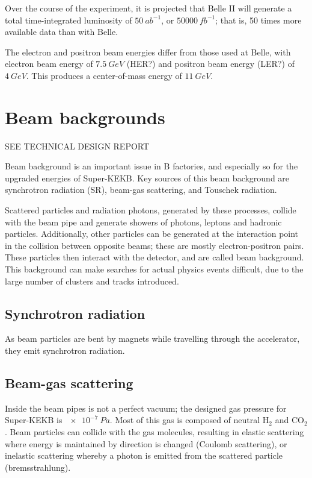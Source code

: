 \documentclass[12pt]{thesis}  %
\begin{document}
Over the course of the experiment, it is projected that Belle II will generate a total time-integrated luminosity of $\SI{50}{ab^{-1}}$, or $\SI{50000}{fb^{-1}}$; that is, 50 times more available data than with Belle.

The electron and positron beam energies differ from those used at Belle, with electron beam energy of $\SI{7.5}{GeV}$ (HER?) and positron beam energy (LER?) of $\SI{4}{GeV}$. This produces a center-of-mass energy of $\SI{11}{GeV}$.


\pagebreak


\section{Beam backgrounds}

SEE TECHNICAL DESIGN REPORT

Beam background is an important issue in B factories, and especially so for the upgraded energies of Super-KEKB. Key sources of this beam background are synchrotron radiation (SR), beam-gas scattering, and Touschek radiation.

Scattered particles and radiation photons, generated by these processes, collide with the beam pipe and generate showers of photons, leptons and hadronic particles. Additionally, other particles can be generated at the interaction point in the collision between opposite beams; these are mostly electron-positron pairs. These particles then interact with the detector, and are called beam background. This background can make searches for actual physics events difficult, due to the large number of clusters and tracks introduced.

\subsection{Synchrotron radiation}

As beam particles are bent by magnets while travelling through the accelerator, they emit synchrotron radiation.

\subsection{Beam-gas scattering}	

Inside the beam pipes is not a perfect vacuum; the designed gas pressure for Super-KEKB is $\SI{e-7}{Pa}$. Most of this gas is composed of neutral H$_2$ and CO$_2$. Beam particles can collide with the gas molecules, resulting in elastic scattering where energy is maintained by direction is changed (Coulomb scattering), or inelastic scattering whereby a photon is emitted from the scattered particle (bremsstrahlung).
\end{document}
